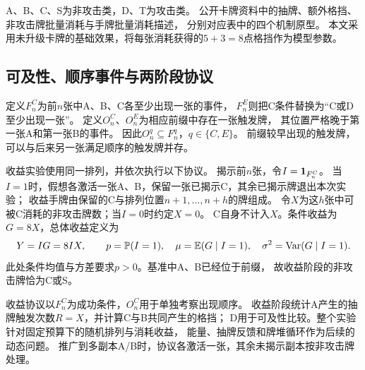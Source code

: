 A、B、C、S为非攻击类，D、T为攻击类。
公开卡牌资料中的抽牌、额外格挡、非攻击牌批量消耗与手牌批量消耗描述，
分别对应表中的四个机制原型\cite{dark,pain,wind,fire}。
本文采用未升级卡牌的基础效果，将每张消耗获得的$5+3=8$点格挡作为模型参数。

\subsection{可及性、顺序事件与两阶段协议}
定义$F_n^C$为前$n$张中A、B、C各至少出现一张的事件，
$F_n^E$则把C条件替换为“C或D至少出现一张”。
定义$O_n^C$、$O_n^E$为相应前缀中存在一张触发牌，
其位置严格晚于第一张A和第一张B的事件。
因此$O_n^q\subseteq F_n^q$，$q\in\{C,E\}$。
前缀较早出现的触发牌，可以与后来另一张满足顺序的触发牌并存。

收益实验使用同一排列，并依次执行以下协议。
揭示前$n$张，令$I=\mathbf 1_{F_n^C}$。
当$I=1$时，假想各激活一张A、B，保留一张已揭示C，其余已揭示牌退出本次实验；
收益手牌由保留的C与排列位置$n+1,\ldots,n+h$的牌组成。
令$X$为这$h$张中可被C消耗的非攻击牌数；当$I=0$时约定$X=0$。
C自身不计入$X$。条件收益为$G=8X$，总体收益定义为
\begin{equation}\label{eq:payoff-definition}
Y=IG=8IX,\qquad
p=\mathbb P(I=1),\quad
\mu=\mathbb E(G\mid I=1),\quad
\sigma^2=\operatorname{Var}(G\mid I=1).
\end{equation}
此处条件均值与方差要求$p>0$。基准中A、B已经位于前缀，
故收益阶段的非攻击牌恰为C或S。

收益协议以$F_n^C$为成功条件，$O_n^C$用于单独考察出现顺序。
收益阶段统计A产生的抽牌触发次数$R=X$，并计算C与B共同产生的格挡；
D用于可及性比较。整个实验针对固定预算下的随机排列与消耗收益，
能量、抽牌反馈和牌堆循环作为后续的动态问题。
推广到多副本A/B时，协议各激活一张，其余未揭示副本按非攻击牌处理。
